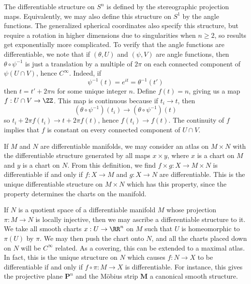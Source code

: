 \begin{example}
    The differentiable structure on $S^n$ is defined by the stereographic projection maps. Equivalently, we may also define this structure on $S^1$ by the angle functions. The generalized spherical coordinates also specify this structure, but require a rotation in higher dimensions due to singularities when $n \geq 2$, so results get exponentially more complicated. To verify that the angle functions are differentiable, we note that if $(\theta,U)$ and $(\psi,V)$ are angle functions, then $\theta \circ \psi^{-1}$ is just a translation by a multiple of $2\pi$ on each connected component of $\psi(U \cap V)$, hence $C^\infty$. Indeed, if
    \[ \psi^{-1}(t) = e^{it} = \theta^{-1}(t') \]
    then $t = t' + 2 \pi n$ for some unique integer $n$. Define $f(t) = n$, giving us a map $f: U \cap V \to \ZZ$. This map is continuous because if $t_i \to t$, then
    \[ (\theta \circ \psi^{-1})(t_i) \to (\theta \circ \psi^{-1})(t) \]
    so $t_i + 2 \pi f(t_i) \to t + 2 \pi f(t)$, hence $f(t_i) \to f(t)$. The continuity of $f$ implies that $f$ is constant on every connected component of $U \cap V$.
\end{example}

\begin{example}
    If $M$ and $N$ are differentiable manifolds, we may consider an atlas on $M \times N$ with the differentiable structure generated by all maps $x \times y$, where $x$ is a chart on $M$ and $y$ is a chart on $N$. From this definition, we find $f \times g: X \to M \times N$ is differentiable if and only if $f: X \to M$ and $g: X \to N$ are differentiable. This is the unique differentiable structure on $M \times N$ which has this property, since the property determines the charts on the manifold.
\end{example}

\begin{example}
    If $N$ is a quotient space of a differentiable manifold $M$ whose projection $\pi:M \to N$ is locally injective, then we may ascribe a differentiable structure to it. We take all smooth charts $x:U \to \RR^n$ on $M$ such that $U$ is homeomorphic to $\pi(U)$ by $\pi$. We may then push the chart onto $N$, and all the charts placed down on $N$ will be $C^\infty$ related. As a covering, this can be extended to a maximal atlas. In fact, this is the unique structure on $N$ which causes $f: N \to X$ to be differentiable if and only if $f \circ \pi: M \to X$ is differentiable. For instance, this gives the projective plane $\mathbf{P}^n$ and the M\"{o}bius strip $\mathbf{M}$ a canonical smooth structure.
\end{example}

